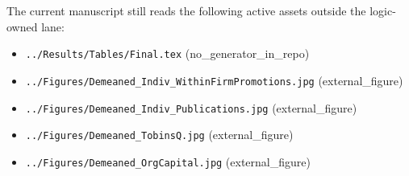 \documentclass{article}
\begin{document}
The current manuscript still reads the following active assets outside the logic-owned lane:

\begin{itemize}
\item \texttt{../Results/Tables/Final.tex} (no\_generator\_in\_repo)
\item \texttt{../Figures/Demeaned\_Indiv\_WithinFirmPromotions.jpg} (external\_figure)
\item \texttt{../Figures/Demeaned\_Indiv\_Publications.jpg} (external\_figure)
\item \texttt{../Figures/Demeaned\_TobinsQ.jpg} (external\_figure)
\item \texttt{../Figures/Demeaned\_OrgCapital.jpg} (external\_figure)
\end{itemize}
\end{document}
